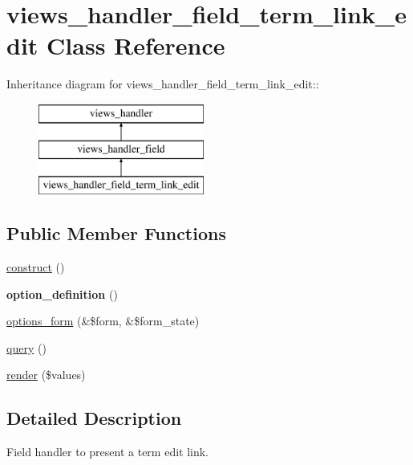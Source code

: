 \hypertarget{classviews__handler__field__term__link__edit}{
\section{views\_\-handler\_\-field\_\-term\_\-link\_\-edit Class Reference}
\label{classviews__handler__field__term__link__edit}
}
Inheritance diagram for views\_\-handler\_\-field\_\-term\_\-link\_\-edit::\begin{figure}[H]
\begin{center}
\leavevmode
\includegraphics[height=3cm]{classviews__handler__field__term__link__edit}
\end{center}
\end{figure}
\subsection*{Public Member Functions}
\begin{DoxyCompactItemize}
\item 
\hyperlink{classviews__handler__field__term__link__edit_aaad58c0af52bdc78aa28b6571340bb07}{construct} ()
\item 
\hypertarget{classviews__handler__field__term__link__edit_a3791b5ca30ebfc9a320c57fdea44e35f}{
{\bfseries option\_\-definition} ()}
\label{classviews__handler__field__term__link__edit_a3791b5ca30ebfc9a320c57fdea44e35f}

\item 
\hyperlink{classviews__handler__field__term__link__edit_a3673c12b0def82d67381ae9b4c26955e}{options\_\-form} (\&\$form, \&\$form\_\-state)
\item 
\hyperlink{classviews__handler__field__term__link__edit_a44535334ed9b5453f0b839621e1f560a}{query} ()
\item 
\hyperlink{classviews__handler__field__term__link__edit_a626104d5ff55d23f8e07f1bec3336b2c}{render} (\$values)
\end{DoxyCompactItemize}


\subsection{Detailed Description}
Field handler to present a term edit link. 

